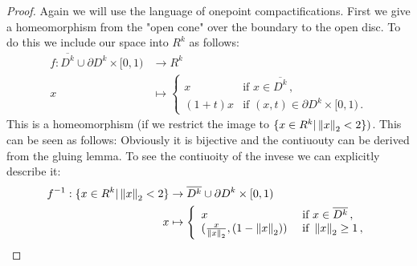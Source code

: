 \begin{proof}
	Again we will use the language of onepoint compactifications. First we give a homeomorphism from the "open cone" over the boundary to the open disc. To do this we include our space into $R^k$ as follows:
	\begin{align*}
	f:	\overline{D^k}\cup \partial D^k \times [0,1) &\to R^{k}\\
		x								 &\mapsto
		 \left\{ \begin{array}{ll}
		 	x & \text{if } x \in \overline{D^k} \, , \\
		 	(1+t)x& \text{if } (x,t)\in \partial D^k \times [0,1) \, . 
		 \end{array}
		 \right.
	\end{align*} This is a homeomorphism (if we restrict the image to $\{x\in R^k| \left\lVert x\right\rVert_2<2\})$. This can be seen as follows:
	Obviously it is bijective and the contiuouty can be derived from the gluing lemma. To see the contiuoity of the invese we can explicitly describe it:
\begin{align*}
	f^{-1}: \{x\in R^k| \left\lVert x\right\rVert_2<2\}  &\to    \overline{D^k}\cup \partial D^k \times [0,1) \\
	x 									&\mapsto \left\{ 
	\begin{array}{ll}
		x & \text{ if } x\in \overline{D^k} \,,  \\
		(\frac{x}{\left\lVert x\right\rVert_2},(1-\left\lVert x\right\rVert_2)) & \text{ if } \left\lVert x\right\rVert_2\geq 1 \,,
	\end{array}
	\right.
\end{align*}
\end{proof}
